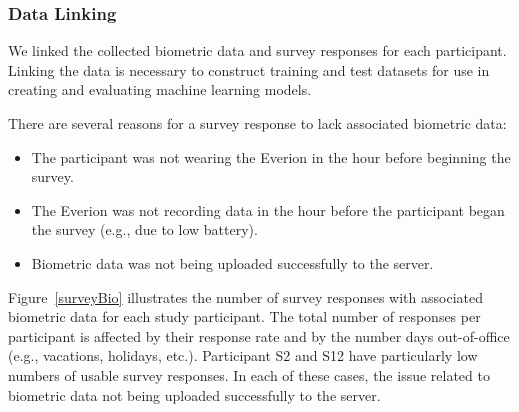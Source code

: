 \subsubsection{Data Linking}

We linked the collected biometric data and survey responses for each participant. Linking the data is necessary to construct training and test datasets for use in creating and evaluating machine learning models.


There are several reasons for a survey response to lack associated biometric data:
\begin{itemize}
\item The participant was not wearing the Everion in the hour before beginning the survey.
\item The Everion was not recording data in the hour before the participant began the survey (e.g., due to low battery).
\item Biometric data was not being uploaded successfully to the server.
\end{itemize}

Figure~\ref{surveyBio} illustrates the number of survey responses with associated biometric data for each study participant. 
The total number of responses per participant is affected by their response rate and by the number days out-of-office (e.g., vacations, holidays, etc.). 
Participant S2 and S12 have particularly low numbers of usable survey responses. In each of these cases, the issue related to biometric data not being uploaded successfully to the server.

